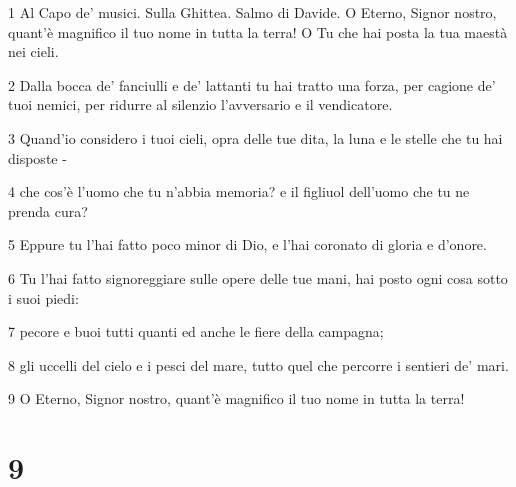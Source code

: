 \par 1 Al Capo de' musici. Sulla Ghittea. Salmo di Davide. O Eterno, Signor nostro, quant'è magnifico il tuo nome in tutta la terra! O Tu che hai posta la tua maestà nei cieli.
\par 2 Dalla bocca de' fanciulli e de' lattanti tu hai tratto una forza, per cagione de' tuoi nemici, per ridurre al silenzio l'avversario e il vendicatore.
\par 3 Quand'io considero i tuoi cieli, opra delle tue dita, la luna e le stelle che tu hai disposte -
\par 4 che cos'è l'uomo che tu n'abbia memoria? e il figliuol dell'uomo che tu ne prenda cura?
\par 5 Eppure tu l'hai fatto poco minor di Dio, e l'hai coronato di gloria e d'onore.
\par 6 Tu l'hai fatto signoreggiare sulle opere delle tue mani, hai posto ogni cosa sotto i suoi piedi:
\par 7 pecore e buoi tutti quanti ed anche le fiere della campagna;
\par 8 gli uccelli del cielo e i pesci del mare, tutto quel che percorre i sentieri de' mari.
\par 9 O Eterno, Signor nostro, quant'è magnifico il tuo nome in tutta la terra!

\chapter{9}

